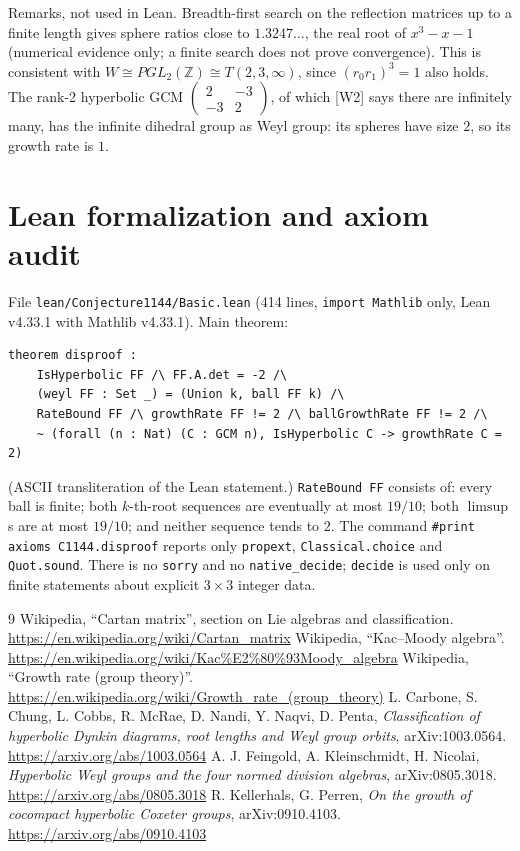 \documentclass[11pt]{article}
\theoremstyle{definition}
\begin{document}
Remarks, not used in Lean. Breadth-first search on the reflection matrices up to a finite length
gives sphere ratios close to $1.3247\ldots$, the real root of $x^3-x-1$ (numerical evidence
only; a finite search does not prove convergence). This is consistent with $W\cong
PGL_2(\mathbb Z)\cong T(2,3,\infty)$, since $(r_0r_1)^3=1$ also holds. The rank-2 hyperbolic
GCM $\begin{pmatrix}2&-3\\-3&2\end{pmatrix}$, of which [W2] says there are infinitely many,
has the infinite dihedral group as Weyl group: its spheres have size $2$, so its growth rate
is $1$.

\section{Lean formalization and axiom audit}

File \texttt{lean/Conjecture1144/Basic.lean} (414 lines, \texttt{import Mathlib} only, Lean
v4.33.1 with Mathlib v4.33.1). Main theorem:
\begin{verbatim}
theorem disproof :
    IsHyperbolic FF /\ FF.A.det = -2 /\
    (weyl FF : Set _) = (Union k, ball FF k) /\
    RateBound FF /\ growthRate FF != 2 /\ ballGrowthRate FF != 2 /\
    ~ (forall (n : Nat) (C : GCM n), IsHyperbolic C -> growthRate C = 2)
\end{verbatim}
(ASCII transliteration of the Lean statement.) \texttt{RateBound FF} consists of: every ball is finite; both $k$-th-root sequences are
eventually at most $19/10$; both $\limsup$s are at most $19/10$; and neither sequence tends to
$2$. The command \texttt{\#print axioms C1144.disproof} reports only \texttt{propext},
\texttt{Classical.choice} and \texttt{Quot.sound}. There is no \texttt{sorry} and no
\texttt{native\_decide}; \texttt{decide} is used only on finite statements about explicit
$3\times 3$ integer data.

\begin{thebibliography}{9}
 Wikipedia, ``Cartan matrix'', section on Lie algebras and classification.
\url{https://en.wikipedia.org/wiki/Cartan_matrix}
\bibitem[W2]{W2} Wikipedia, ``Kac--Moody algebra''.
\url{https://en.wikipedia.org/wiki/Kac%E2%80%93Moody_algebra}
\bibitem[W3]{W3} Wikipedia, ``Growth rate (group theory)''.
\url{https://en.wikipedia.org/wiki/Growth_rate_(group_theory)}
\bibitem[C]{C} L. Carbone, S. Chung, L. Cobbs, R. McRae, D. Nandi, Y. Naqvi, D. Penta,
\emph{Classification of hyperbolic Dynkin diagrams, root lengths and Weyl group orbits},
arXiv:1003.0564. \url{https://arxiv.org/abs/1003.0564}
\bibitem[FKN]{FKN} A. J. Feingold, A. Kleinschmidt, H. Nicolai, \emph{Hyperbolic Weyl groups and
the four normed division algebras}, arXiv:0805.3018. \url{https://arxiv.org/abs/0805.3018}
\bibitem[KP]{KP} R. Kellerhals, G. Perren, \emph{On the growth of cocompact hyperbolic Coxeter
groups}, arXiv:0910.4103. \url{https://arxiv.org/abs/0910.4103}
\end{thebibliography}
\end{document}
